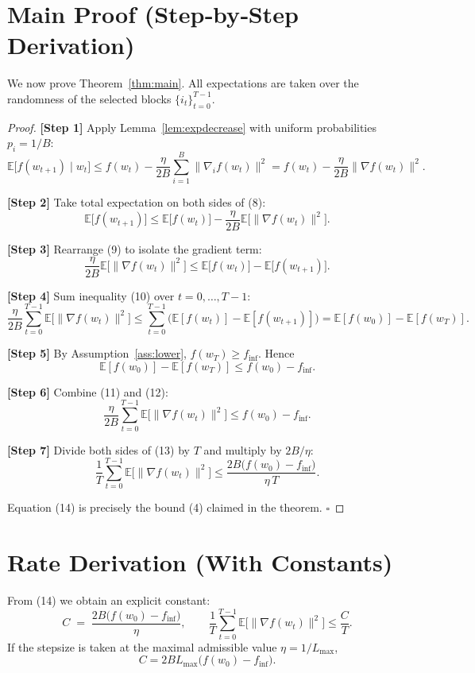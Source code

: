 \documentclass{article}
\begin{document}
\section*{Main Proof (Step‑by‑Step Derivation)}
We now prove Theorem~\ref{thm:main}. All expectations are taken over the randomness of the selected blocks $\{i_t\}_{t=0}^{T-1}$.

\begin{proof}
\textbf{[Step 1]} Apply Lemma~\ref{lem:expdecrease} with uniform probabilities $p_i=1/B$:
\[
\mathbb{E}\!\bigl[f(w_{t+1})\mid w_t\bigr]
\le
f(w_t)-\frac{\eta}{2B}\sum_{i=1}^{B}\|\nabla_i f(w_t)\|^{2}
= f(w_t)-\frac{\eta}{2B}\|\nabla f(w_t)\|^{2}.
\tag{8}
\]

\textbf{[Step 2]} Take total expectation on both sides of (8):
\[
\mathbb{E}\!\bigl[f(w_{t+1})\bigr]
\le
\mathbb{E}\!\bigl[f(w_{t})\bigr]-\frac{\eta}{2B}\mathbb{E}\!\bigl[\|\nabla f(w_t)\|^{2}\bigr].
\tag{9}
\]

\textbf{[Step 3]} Rearrange (9) to isolate the gradient term:
\[
\frac{\eta}{2B}\mathbb{E}\!\bigl[\|\nabla f(w_t)\|^{2}\bigr]
\le
\mathbb{E}\!\bigl[f(w_{t})\bigr]-\mathbb{E}\!\bigl[f(w_{t+1})\bigr].
\tag{10}
\]

\textbf{[Step 4]} Sum inequality (10) over $t=0,\dots ,T-1$:
\[
\frac{\eta}{2B}\sum_{t=0}^{T-1}\mathbb{E}\!\bigl[\|\nabla f(w_t)\|^{2}\bigr]
\le
\sum_{t=0}^{T-1}\bigl(\mathbb{E}[f(w_{t})]-\mathbb{E}[f(w_{t+1})]\bigr)
= \mathbb{E}[f(w_{0})]-\mathbb{E}[f(w_{T})].
\tag{11}
\]

\textbf{[Step 5]} By Assumption~\ref{ass:lower}, $f(w_T)\ge f_{\inf}$. Hence
\[
\mathbb{E}[f(w_{0})]-\mathbb{E}[f(w_{T})]\le f(w_{0})-f_{\inf}.
\tag{12}
\]

\textbf{[Step 6]} Combine (11) and (12):
\[
\frac{\eta}{2B}\sum_{t=0}^{T-1}\mathbb{E}\!\bigl[\|\nabla f(w_t)\|^{2}\bigr]
\le
f(w_{0})-f_{\inf}.
\tag{13}
\]

\textbf{[Step 7]} Divide both sides of (13) by $T$ and multiply by $2B/\eta$:
\[
\frac{1}{T}\sum_{t=0}^{T-1}\mathbb{E}\!\bigl[\|\nabla f(w_t)\|^{2}\bigr]
\le
\frac{2B\bigl(f(w_{0})-f_{\inf}\bigr)}{\eta\,T}.
\tag{14}
\]

Equation (14) is precisely the bound (4) claimed in the theorem. \hfill $\square$
\end{proof}

\section*{Rate Derivation (With Constants)}
From (14) we obtain an explicit constant:
\[
C\;=\;\frac{2B\bigl(f(w_{0})-f_{\inf}\bigr)}{\eta},
\qquad
\frac{1}{T}\sum_{t=0}^{T-1}\mathbb{E}\!\bigl[\|\nabla f(w_t)\|^{2}\bigr]\le\frac{C}{T}.
\]
If the stepsize is taken at the maximal admissible value $\eta=1/L_{\max}$,
\[
C = 2B L_{\max}\bigl(f(w_{0})-f_{\inf}\bigr).
\]
\end{document}
